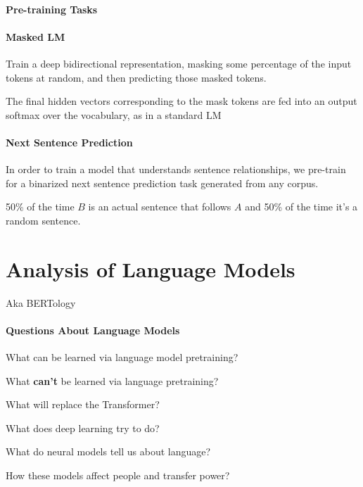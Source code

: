 \documentclass[10pt]{report}
\begin{document}
\paragraph{Pre-training Tasks}
\begin{multicols}{2}
	\paragraph{Masked LM}\begin{list}{}{}
		\item Train a deep bidirectional representation, masking some percentage of the input tokens at random, and then predicting those masked tokens.
		\item The final hidden vectors corresponding to the mask tokens are fed into an output softmax over the vocabulary, as in a standard LM
	\end{list}
	\columnbreak
	\paragraph{Next Sentence Prediction}\begin{list}{}{}
		\item In order to train a model that understands sentence relationships, we pre-train for a binarized next sentence prediction task generated from any corpus.
		\item 50\% of the time $B$ is an actual sentence that follows $A$ and 50\% of the time it's a random sentence.
	\end{list}
\end{multicols}
\section{Analysis of Language Models}
Aka BERTology
\paragraph{Questions About Language Models} \begin{list}{}{}
	\item What can be learned via language model pretraining?
	\item What \textbf{can't} be learned via language pretraining?
	\item What will replace the Transformer?
	\item What does deep learning try to do?
	\item What do neural models tell us about language?
	\item How these models affect people and transfer power? 
\end{list}
\end{document}
